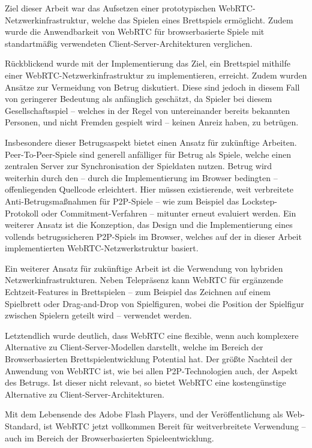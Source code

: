 Ziel dieser Arbeit war das Aufsetzen einer prototypischen WebRTC-Netzwerkinfrastruktur, welche das Spielen eines Brettspiels ermöglicht. Zudem wurde die Anwendbarkeit von \acs{WebRTC} für browserbasierte Spiele mit standartmäßig verwendeten Client-Server-Architekturen verglichen.\par

Rückblickend wurde mit der Implementierung das Ziel, ein Brettspiel mithilfe einer WebRTC-Netzwerkinfrastruktur zu implementieren, erreicht. Zudem wurden Ansätze zur Vermeidung von Betrug diskutiert. Diese sind jedoch in diesem Fall von geringerer Bedeutung als anfänglich geschätzt, da Spieler bei diesem Gesellschaftsspiel -- welches in der Regel von untereinander bereits bekannten Personen, und nicht Fremden gespielt wird -- keinen Anreiz haben, zu betrügen.\par

Insbesondere dieser Betrugsaspekt bietet einen Ansatz für zukünftige Arbeiten. Peer-To-Peer-Spiele sind generell anfälliger für Betrug als Spiele, welche einen zentralen Server zur Synchronisation der Spieldaten nutzen. Betrug wird weiterhin durch den -- durch die Implementierung im Browser bedingten -- offenliegenden Quellcode erleichtert. Hier müssen existierende, weit verbreitete Anti-Betrugsmaßnahmen für \acs{P2P}-Spiele -- wie zum Beispiel das Lockstep-Protokoll oder Commitment-Verfahren -- mitunter erneut evaluiert werden. Ein weiterer Ansatz ist die Konzeption, das Design und die Implementierung eines vollends betrugssicheren \acs{P2P}-Spiels im Browser, welches auf der in dieser Arbeit implementierten \acs{WebRTC}-Netzwerkstruktur basiert.\par

Ein weiterer Ansatz für zukünftige Arbeit ist die Verwendung von hybriden Netzwerkinfrastrukturen. Neben Telepräsenz kann WebRTC für ergänzende Echtzeit-Features in Brettspielen -- zum Beispiel das Zeichnen auf einem Spielbrett oder Drag-and-Drop von Spielfiguren, wobei die Position der Spielfigur zwischen Spielern geteilt wird -- verwendet werden.\par

Letztendlich wurde deutlich, dass WebRTC eine flexible, wenn auch komplexere Alternative zu Client-Server-Modellen darstellt, welche im Bereich der Browserbasierten Brettspielentwicklung Potential hat. Der größte Nachteil der Anwendung von WebRTC ist, wie bei allen \acs{P2P}-Technologien auch, der Aspekt des Betrugs. Ist dieser nicht relevant, so bietet WebRTC eine kostengünstige Alternative zu Client-Server-Architekturen.\par

Mit dem Lebensende des Adobe Flash Players, und der Veröffentlichung als Web-Standard, ist WebRTC jetzt vollkommen Bereit für weitverbreitete Verwendung -- auch im Bereich der Browserbasierten Spieleentwicklung.\par